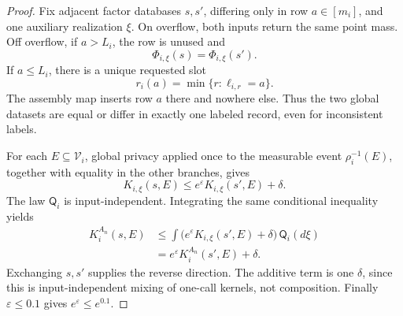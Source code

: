 \begin{proof}
Fix adjacent factor databases \(s,s'\), differing only in row
\(a\in[m_i]\), and one auxiliary realization \(\xi\).  On overflow, both
inputs return the same point mass.  Off overflow, if \(a>L_i\), the row is
unused and
\begin{equation}\label{eq:step-012-unused-row}
\Phi_{i,\xi}(s)=\Phi_{i,\xi}(s').
\end{equation}
If \(a\le L_i\), there is a unique requested slot
\begin{equation}\label{eq:step-012-unique-slot}
r_i(a)=\min\{r:\ell_{i,r}=a\}.
\end{equation}
The assembly map inserts row \(a\) there and nowhere else.  Thus the two
global datasets are equal or differ in exactly one labeled record, even
for inconsistent labels.

For each \(E\subseteq\mathcal V_i\), global privacy applied once to the
measurable event \(\rho_i^{-1}(E)\), together with equality in the other
branches, gives
\begin{equation}\label{eq:step-012-conditional-dp}
K_{i,\xi}(s,E)
\le e^\varepsilon K_{i,\xi}(s',E)+\delta.
\end{equation}
The law \(\mathsf Q_i\) is input-independent.  Integrating the same
conditional inequality yields
\begin{equation}\label{eq:step-012-hidden-dp}
\begin{split}
K_i^{A_n}(s,E)
&\le\int\bigl(e^\varepsilon K_{i,\xi}(s',E)+\delta\bigr)
\,\mathsf Q_i(d\xi)\\
&=e^\varepsilon K_i^{A_n}(s',E)+\delta.
\end{split}
\end{equation}
Exchanging \(s,s'\) supplies the reverse direction.  The additive term is
one \(\delta\), since this is input-independent mixing of one-call kernels,
not composition.  Finally \(\varepsilon\le0.1\) gives
\(e^\varepsilon\le e^{0.1}\).
\end{proof}

